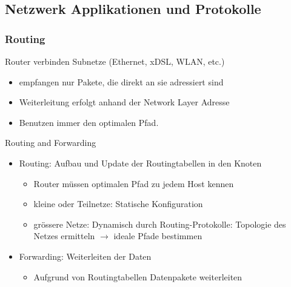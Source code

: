\subsection{Netzwerk Applikationen und Protokolle}

\subsubsection{Routing}

\begin{definition}{Router} verbinden Subnetze (Ethernet, xDSL, WLAN, etc.)
    \begin{itemize}
        \item empfangen nur Pakete, die direkt an sie adressiert sind
        \item Weiterleitung erfolgt anhand der Network Layer Adresse
        \item Benutzen immer den optimalen Pfad.
    \end{itemize}
\end{definition}
    

\begin{concept}{Routing and Forwarding}
    \begin{itemize}
        \item Routing: Aufbau und Update der Routingtabellen in den Knoten
            \begin{itemize}
                \item Router müssen optimalen Pfad zu jedem Host kennen
                \item kleine oder Teilnetze: Statische Konfiguration
                \item grössere Netze: Dynamisch durch Routing-Protokolle: Topologie des Netzes ermitteln $\rightarrow$ ideale Pfade bestimmen
            \end{itemize}
        \item Forwarding: Weiterleiten der Daten
        \begin{itemize}
            \item Aufgrund von Routingtabellen Datenpakete weiterleiten
        \end{itemize}
    \end{itemize}
\end{concept}

